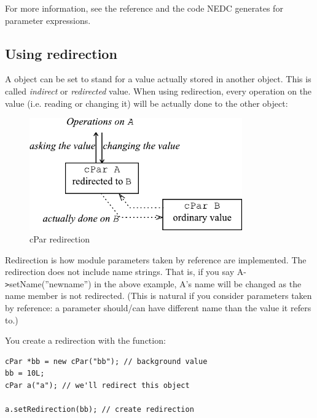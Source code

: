 For more information, see the reference and the code NEDC generates
for parameter expressions.



\subsection{Using redirection}

A  object can be set to stand for a value actually stored
in another  object. This is called \textit{indirect} or
\textit{redirected} value. When using redirection,
every operation on the value (i.e.  reading or changing it) will be
actually done to the other  object:

\begin{figure}[htbp]
  \begin{center}
    \includegraphics[width=3.608in, height=1.908in]{figures/usmanFig11}
    \caption{cPar redirection}
    \label{fig:ch-sim-lib:cPar-redirection}
  \end{center}
\end{figure}

Redirection is how module parameters taken by
reference are implemented.  The
redirection does not include name strings. That is, if you say
A-\texttt{>}setName(''newname'') in the above example, A's name will
be changed as the name member is not redirected. (This is natural if
you consider parameters taken by reference: a parameter should/can
have different name than the value it refers to.)


You create a redirection with the  function:

\begin{verbatim}
cPar *bb = new cPar("bb"); // background value
bb = 10L;
cPar a("a"); // we'll redirect this object

a.setRedirection(bb); // create redirection
\end{verbatim}


